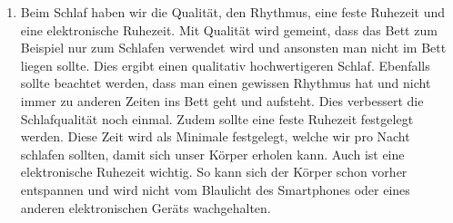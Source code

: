 \begin{enumerate}
  \item Beim Schlaf haben wir die Qualität, den Rhythmus, eine feste Ruhezeit und eine elektronische Ruhezeit. Mit Qualität wird gemeint, dass das Bett zum Beispiel nur zum Schlafen verwendet wird und ansonsten man nicht im Bett liegen sollte. Dies ergibt einen qualitativ hochwertigeren Schlaf. Ebenfalls sollte beachtet werden, dass man einen gewissen Rhythmus hat und nicht immer zu anderen Zeiten ins Bett geht und aufsteht. Dies verbessert die Schlafqualität noch einmal. Zudem sollte eine feste Ruhezeit festgelegt werden. Diese Zeit wird als Minimale festgelegt, welche wir pro Nacht schlafen sollten, damit sich unser Körper erholen kann. Auch ist eine elektronische Ruhezeit wichtig. So kann sich der Körper schon vorher entspannen und wird nicht vom Blaulicht des Smartphones oder eines anderen elektronischen Geräts wachgehalten.
\end{enumerate}